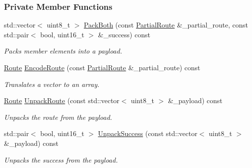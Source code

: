 \subsubsection*{Private Member Functions}
\begin{DoxyCompactItemize}
\item 
std\+::vector$<$ uint8\+\_\+t $>$ \hyperlink{classosse_1_1collaborate_1_1_packet_return_a4e9f99f25411e60d84bd08940496efec}{Pack\+Both} (const \hyperlink{classosse_1_1collaborate_1_1_packet_return_a56d5b319f0625cdabbfc4f6cbd01b002}{Partial\+Route} \&\+\_\+partial\+\_\+route, const std\+::pair$<$ bool, uint16\+\_\+t $>$ \&\+\_\+success) const
\begin{DoxyCompactList}\small\item\em Packs member elements into a payload. \end{DoxyCompactList}\item 
\hyperlink{classosse_1_1collaborate_1_1_packet_return_a1c00d25b9e8d526be915c28b8ee0ba3b}{Route} \hyperlink{classosse_1_1collaborate_1_1_packet_return_a8b63f26c2503ba37b133aab0da1e718c}{Encode\+Route} (const \hyperlink{classosse_1_1collaborate_1_1_packet_return_a56d5b319f0625cdabbfc4f6cbd01b002}{Partial\+Route} \&\+\_\+partial\+\_\+route) const
\begin{DoxyCompactList}\small\item\em Translates a vector to an array. \end{DoxyCompactList}\item 
\hyperlink{classosse_1_1collaborate_1_1_packet_return_a1c00d25b9e8d526be915c28b8ee0ba3b}{Route} \hyperlink{classosse_1_1collaborate_1_1_packet_return_ae430891dd740edab4984a0279816797c}{Unpack\+Route} (const std\+::vector$<$ uint8\+\_\+t $>$ \&\+\_\+payload) const
\begin{DoxyCompactList}\small\item\em Unpacks the route from the payload. \end{DoxyCompactList}\item 
std\+::pair$<$ bool, uint16\+\_\+t $>$ \hyperlink{classosse_1_1collaborate_1_1_packet_return_a89a3e35f9caf7dc3cfe13533ae8b538f}{Unpack\+Success} (const std\+::vector$<$ uint8\+\_\+t $>$ \&\+\_\+payload) const
\begin{DoxyCompactList}\small\item\em Unpacks the success from the payload. \end{DoxyCompactList}\end{DoxyCompactItemize}
